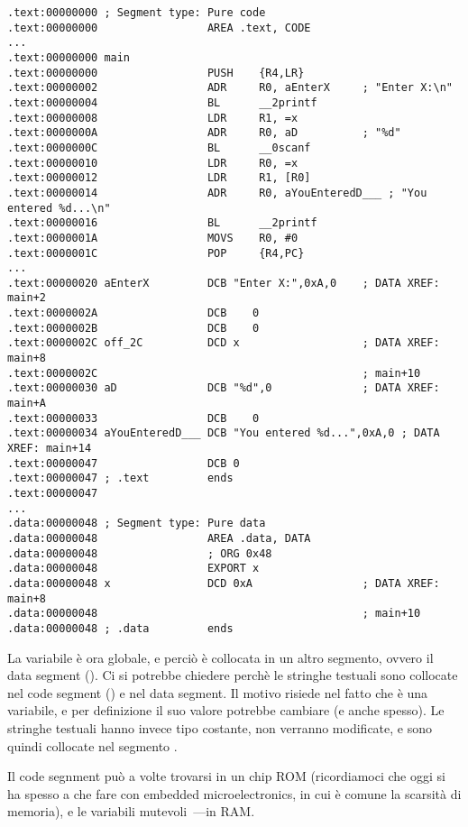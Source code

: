 
\begin{lstlisting}
.text:00000000 ; Segment type: Pure code
.text:00000000                 AREA .text, CODE
...
.text:00000000 main
.text:00000000                 PUSH    {R4,LR}
.text:00000002                 ADR     R0, aEnterX     ; "Enter X:\n"
.text:00000004                 BL      __2printf
.text:00000008                 LDR     R1, =x
.text:0000000A                 ADR     R0, aD          ; "%d"
.text:0000000C                 BL      __0scanf
.text:00000010                 LDR     R0, =x
.text:00000012                 LDR     R1, [R0]
.text:00000014                 ADR     R0, aYouEnteredD___ ; "You entered %d...\n"
.text:00000016                 BL      __2printf
.text:0000001A                 MOVS    R0, #0
.text:0000001C                 POP     {R4,PC}
...
.text:00000020 aEnterX         DCB "Enter X:",0xA,0    ; DATA XREF: main+2
.text:0000002A                 DCB    0
.text:0000002B                 DCB    0
.text:0000002C off_2C          DCD x                   ; DATA XREF: main+8
.text:0000002C                                         ; main+10
.text:00000030 aD              DCB "%d",0              ; DATA XREF: main+A
.text:00000033                 DCB    0
.text:00000034 aYouEnteredD___ DCB "You entered %d...",0xA,0 ; DATA XREF: main+14
.text:00000047                 DCB 0
.text:00000047 ; .text         ends
.text:00000047
...
.data:00000048 ; Segment type: Pure data
.data:00000048                 AREA .data, DATA
.data:00000048                 ; ORG 0x48
.data:00000048                 EXPORT x
.data:00000048 x               DCD 0xA                 ; DATA XREF: main+8
.data:00000048                                         ; main+10
.data:00000048 ; .data         ends
\end{lstlisting}

La variabile  è ora globale, e perciò è collocata in un altro segmento, ovvero il data segment ().
Ci si potrebbe chiedere perchè le stringhe testuali sono collocate nel code segment () e  nel data segment.
Il motivo risiede nel fatto che  è una variabile, e per definizione il suo valore potrebbe cambiare (e anche spesso).
Le stringhe testuali hanno invece tipo costante, non verranno modificate, e sono quindi collocate nel segmento .
\myindex{\RAM}
\myindex{\ROM}

Il code segnment può a volte trovarsi in un chip \ac{ROM} (ricordiamoci che oggi si ha spesso a che fare con embedded microelectronics, in cui è comune la scarsità di memoria), e le variabili mutevoli~---in \ac{RAM}.

